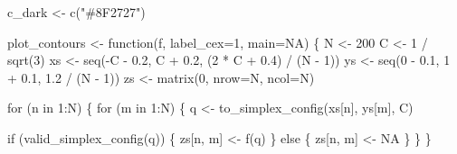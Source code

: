 \documentclass[
  letterpaper,
  DIV=11,
  numbers=noendperiod]{scrartcl}
\newenvironment{Shaded}{\begin{snugshade}}{\end{snugshade}}
\newcommand{\AttributeTok}[1]{\textcolor[rgb]{0.40,0.45,0.13}{#1}}
\newcommand{\ConstantTok}[1]{\textcolor[rgb]{0.56,0.35,0.01}{#1}}
\newcommand{\ControlFlowTok}[1]{\textcolor[rgb]{0.00,0.23,0.31}{#1}}
\newcommand{\DecValTok}[1]{\textcolor[rgb]{0.68,0.00,0.00}{#1}}
\newcommand{\FloatTok}[1]{\textcolor[rgb]{0.68,0.00,0.00}{#1}}
\newcommand{\FunctionTok}[1]{\textcolor[rgb]{0.28,0.35,0.67}{#1}}
\newcommand{\NormalTok}[1]{\textcolor[rgb]{0.00,0.23,0.31}{#1}}
\newcommand{\OtherTok}[1]{\textcolor[rgb]{0.00,0.23,0.31}{#1}}
\newcommand{\SpecialCharTok}[1]{\textcolor[rgb]{0.37,0.37,0.37}{#1}}
\newcommand{\StringTok}[1]{\textcolor[rgb]{0.13,0.47,0.30}{#1}}
\begin{document}
\begin{Shaded}
\begin{Highlighting}[]
\NormalTok{c\_dark }\OtherTok{\textless{}{-}} \FunctionTok{c}\NormalTok{(}\StringTok{"\#8F2727"}\NormalTok{)}

\NormalTok{plot\_contours }\OtherTok{\textless{}{-}} \ControlFlowTok{function}\NormalTok{(f, }\AttributeTok{label\_cex=}\DecValTok{1}\NormalTok{, }\AttributeTok{main=}\ConstantTok{NA}\NormalTok{) \{}
\NormalTok{  N }\OtherTok{\textless{}{-}} \DecValTok{200}
\NormalTok{  C }\OtherTok{\textless{}{-}} \DecValTok{1} \SpecialCharTok{/} \FunctionTok{sqrt}\NormalTok{(}\DecValTok{3}\NormalTok{)}
\NormalTok{  xs }\OtherTok{\textless{}{-}} \FunctionTok{seq}\NormalTok{(}\SpecialCharTok{{-}}\NormalTok{C }\SpecialCharTok{{-}} \FloatTok{0.2}\NormalTok{, C }\SpecialCharTok{+} \FloatTok{0.2}\NormalTok{, (}\DecValTok{2} \SpecialCharTok{*}\NormalTok{ C }\SpecialCharTok{+} \FloatTok{0.4}\NormalTok{) }\SpecialCharTok{/}\NormalTok{ (N }\SpecialCharTok{{-}} \DecValTok{1}\NormalTok{))}
\NormalTok{  ys }\OtherTok{\textless{}{-}} \FunctionTok{seq}\NormalTok{(}\DecValTok{0} \SpecialCharTok{{-}} \FloatTok{0.1}\NormalTok{, }\DecValTok{1} \SpecialCharTok{+} \FloatTok{0.1}\NormalTok{, }\FloatTok{1.2} \SpecialCharTok{/}\NormalTok{ (N }\SpecialCharTok{{-}} \DecValTok{1}\NormalTok{))}
\NormalTok{  zs }\OtherTok{\textless{}{-}} \FunctionTok{matrix}\NormalTok{(}\DecValTok{0}\NormalTok{, }\AttributeTok{nrow=}\NormalTok{N, }\AttributeTok{ncol=}\NormalTok{N)}

  \ControlFlowTok{for}\NormalTok{ (n }\ControlFlowTok{in} \DecValTok{1}\SpecialCharTok{:}\NormalTok{N) \{}
    \ControlFlowTok{for}\NormalTok{ (m }\ControlFlowTok{in} \DecValTok{1}\SpecialCharTok{:}\NormalTok{N) \{}
\NormalTok{      q }\OtherTok{\textless{}{-}} \FunctionTok{to\_simplex\_config}\NormalTok{(xs[n], ys[m], C)}

      \ControlFlowTok{if}\NormalTok{ (}\FunctionTok{valid\_simplex\_config}\NormalTok{(q)) \{}
\NormalTok{        zs[n, m] }\OtherTok{\textless{}{-}} \FunctionTok{f}\NormalTok{(q)}
\NormalTok{      \} }\ControlFlowTok{else}\NormalTok{ \{}
\NormalTok{        zs[n, m] }\OtherTok{\textless{}{-}} \ConstantTok{NA}
\NormalTok{      \}}
\NormalTok{    \}}
\NormalTok{  \}}


\end{Highlighting}
\end{Shaded}
\end{document}
